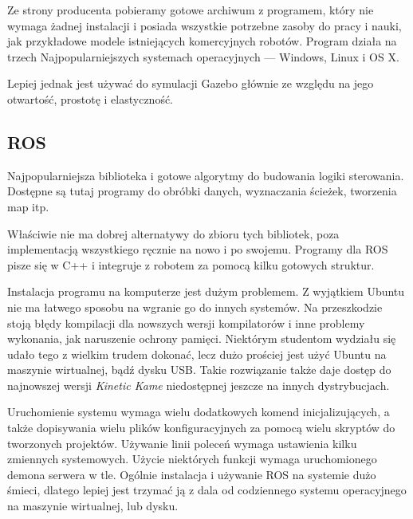 Ze strony producenta pobieramy gotowe archiwum z programem, który nie wymaga żadnej instalacji i posiada wszystkie potrzebne zasoby do pracy i nauki, jak przykładowe modele istniejących komercyjnych robotów.
Program działa na trzech Najpopularniejszych systemach operacyjnych --- Windows, Linux i OS X.

Lepiej jednak jest używać do symulacji Gazebo głównie ze względu na jego otwartość, prostotę i elastyczność.

\subsection{ROS}
Najpopularniejsza biblioteka i gotowe algorytmy do budowania logiki sterowania.
Dostępne są tutaj programy do obróbki danych, wyznaczania ścieżek, tworzenia map itp.

Właściwie nie ma dobrej alternatywy do zbioru tych bibliotek, poza implementacją wszystkiego ręcznie na nowo i po swojemu.
Programy dla ROS pisze się w C++ i integruje z robotem za pomocą kilku gotowych struktur.

Instalacja programu na komputerze jest dużym problemem.
Z wyjątkiem Ubuntu nie ma łatwego sposobu na wgranie go do innych systemów.
Na przeszkodzie stoją błędy kompilacji dla nowszych wersji kompilatorów i inne problemy wykonania, jak naruszenie ochrony pamięci. 
Niektórym studentom wydziału się udało tego z wielkim trudem dokonać, lecz dużo prościej jest użyć Ubuntu na maszynie wirtualnej, bądź dysku USB.
Takie rozwiązanie także daje dostęp do najnowszej wersji \emph{Kinetic Kame} niedostępnej jeszcze na innych dystrybucjach.

Uruchomienie systemu wymaga wielu dodatkowych komend inicjalizujących, a także dopisywania wielu plików konfiguracyjnych za pomocą wielu skryptów do tworzonych projektów.
Używanie linii poleceń wymaga ustawienia kilku zmiennych systemowych.
Użycie niektórych funkcji wymaga uruchomionego demona serwera w tle.
Ogólnie instalacja i używanie ROS na systemie dużo śmieci, dlatego lepiej jest trzymać ją z dala od codziennego systemu operacyjnego na maszynie wirtualnej, lub dysku.

